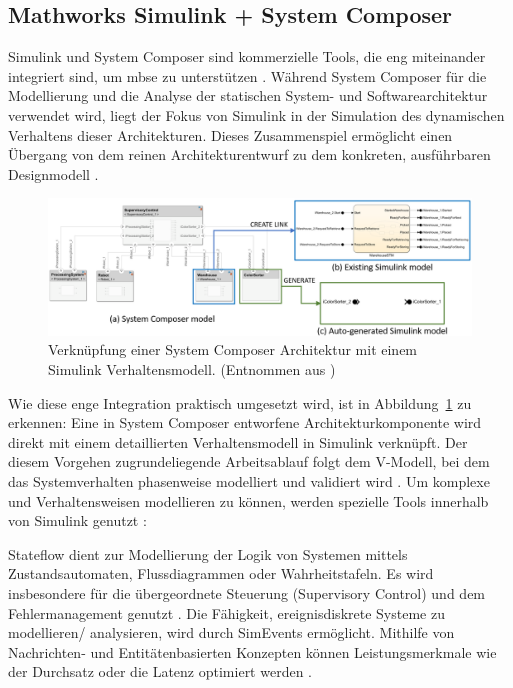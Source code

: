 \subsection{Mathworks Simulink + System Composer}
Simulink und System Composer sind kommerzielle Tools, die eng miteinander integriert sind, um \gls{mbse} zu unterstützen \cite{watkins2020system}.
Während System Composer für die Modellierung und die Analyse der statischen System- und Softwarearchitektur verwendet wird, liegt der Fokus von Simulink in der Simulation des dynamischen Verhaltens dieser Architekturen. Dieses Zusammenspiel ermöglicht einen Übergang von dem reinen Architekturentwurf zu dem konkreten, ausführbaren Designmodell \cite{chatterjee2020applications}.

\begin{figure}[h!]
  \centering
  \includegraphics[width=\textwidth]{figures/03StandDerTechnik/Simulink_System_Composer.png}
  \caption{Verknüpfung einer System Composer Architektur mit einem Simulink Verhaltensmodell. (Entnommen aus \cite{chatterjee2020applications})}
  \label{fig:simulink_system_composer}
\end{figure}

Wie diese enge Integration praktisch umgesetzt wird, ist in Abbildung~\ref{fig:simulink_system_composer} zu erkennen: Eine in System Composer entworfene Architekturkomponente wird direkt mit einem detaillierten Verhaltensmodell in Simulink verknüpft. Der diesem Vorgehen zugrundeliegende Arbeitsablauf folgt dem V-Modell, bei dem das Systemverhalten phasenweise modelliert und validiert wird \cite{themathworksinc.2025system}. Um komplexe und Verhaltensweisen modellieren zu können, werden spezielle Tools innerhalb von Simulink genutzt \cite{chatterjee2020applications}:

Stateflow dient zur Modellierung der Logik von Systemen mittels Zustandsautomaten, Flussdiagrammen oder Wahrheitstafeln. Es wird insbesondere für die übergeordnete Steuerung (Supervisory Control) und dem Fehlermanagement genutzt \cite{chatterjee2020applications}. Die Fähigkeit, ereignisdiskrete Systeme zu modellieren/ analysieren, wird durch SimEvents ermöglicht. Mithilfe von Nachrichten- und Entitätenbasierten Konzepten können Leistungsmerkmale wie der Durchsatz oder die Latenz optimiert werden \cite{chatterjee2020applications}.

